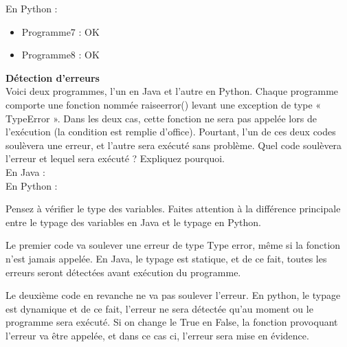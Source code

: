 \begin{Exercice}[15 minutes]
\begin{solution}
        En Python : \\
        
        \begin{itemize}
        	\item Programme7 : OK
        	\item Programme8 : OK
        \end{itemize}
        
        
    \end{solution}
\end{Exercice}

\begin{Exercice}[15 minutes] \textbf{Détection d'erreurs} \\

    Voici deux programmes, l’un en Java et l’autre en Python. Chaque programme comporte une fonction nommée raiseerror() levant une exception de type « TypeError ». Dans les deux cas, cette fonction ne sera pas appelée lors de l'exécution (la condition est remplie d’office). Pourtant, l’un de ces deux codes soulèvera une erreur, et l’autre sera exécuté sans problème. Quel code soulèvera l’erreur et lequel sera exécuté ? Expliquez pourquoi.\\
    
    En Java : \\
    
    
    
    En Python : \\
    
      
    
    
    \begin{conseil}
        Pensez à vérifier le type des variables. Faites attention à la différence principale entre le typage des variables en Java et le typage en Python.\\
    \end{conseil}
    \begin{solution}
    	Le premier code va soulever une erreur de type Type error, même si la fonction n'est jamais appelée. En Java, le typage est statique, et de ce fait, toutes les erreurs seront détectées avant exécution du programme.

Le deuxième code en revanche ne va pas soulever l'erreur. En python, le typage est dynamique et de ce fait, l'erreur ne sera détectée qu'au moment ou le programme sera exécuté. Si on change le True en False, la fonction provoquant l'erreur va être appelée, et dans ce cas ci, l'erreur sera mise en évidence.\\
    \end{solution}

\end{Exercice}
\newpage

